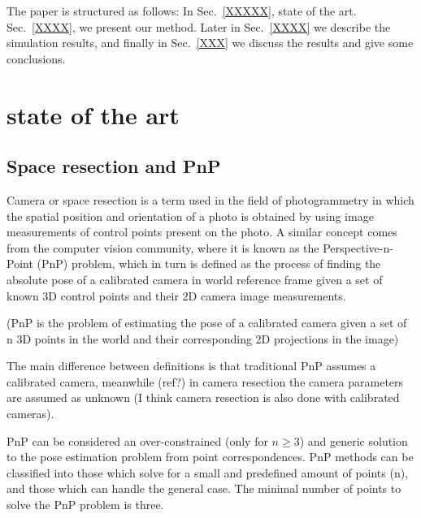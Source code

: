 \documentclass[letterpaper, 10 pt, conference]{ieeeconf}  %
\begin{document}

The paper is structured as follows:  In Sec.~\ref{XXXXX}, state of the art. Sec.~\ref{XXXX}, we present our method. Later in Sec.~\ref{XXXX} we describe the simulation results, and finally in Sec.~\ref{XXX} we discuss the results and give some conclusions.

\section{state of the art}
\label{state_of_the_art}
\subsection{Space resection and PnP}
Camera or space resection is a term used in the field of photogrammetry in which the spatial position and orientation of a photo is obtained by using image measurements of control points present on the photo. A similar concept comes from the computer vision community, where it is known as the Perspective-n-Point (PnP) problem, which in turn is defined as the process of finding the absolute pose of a calibrated camera in world reference frame given a set of known 3D control points and their 2D camera image measurements.

(PnP is the problem of estimating the pose of a calibrated camera given a set of n 3D points in the world and their corresponding 2D projections in the image)

The main difference between definitions is that traditional PnP assumes a calibrated camera, meanwhile (ref?) in camera resection the camera parameters are assumed as unknown (I think camera resection is also done with calibrated cameras). 

PnP can be considered an over-constrained (only for $n \geq 3$) and generic solution to the pose estimation problem from point correspondences. PnP methods can be classified into those which solve for a small and predefined amount of points (n), and those which can handle the general case. The minimal number of points to solve the PnP problem is three.
\end{document}
